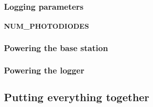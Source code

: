 \documentclass[10pt]{article}
\begin{document}
\subsubsection{Logging parameters}

\paragraph{NUM\_PHOTODIODES}

\subsubsection{Powering the base station}

\subsubsection{Powering the logger}

\subsection{Putting everything together}
\end{document}

